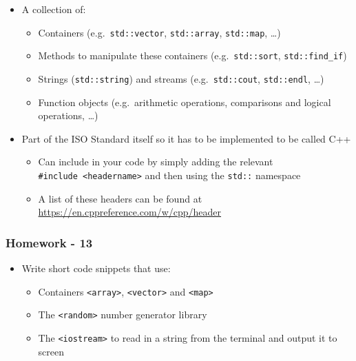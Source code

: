 \begin{itemize}
\tightlist
\item
  A collection of:

  \begin{itemize}
  \tightlist
  \item
    Containers (e.g.~\texttt{std::vector}, \texttt{std::array},
    \texttt{std::map}, \ldots{})
  \item
    Methods to manipulate these containers (e.g.~\texttt{std::sort},
    \texttt{std::find\_if})
  \item
    Strings (\texttt{std::string}) and streams (e.g.~\texttt{std::cout},
    \texttt{std::endl}, \ldots{})
  \item
    Function objects (e.g.~arithmetic operations, comparisons and
    logical operations, \ldots{})
  \end{itemize}
\item
  Part of the ISO Standard itself so it has to be implemented to be
  called C++

  \begin{itemize}
  \tightlist
  \item
    Can include in your code by simply adding the relevant
    \texttt{\#include\ \textless{}headername\textgreater{}} and then
    using the \texttt{std::} namespace
  \item
    A list of these headers can be found at
    \url{https://en.cppreference.com/w/cpp/header}
  \end{itemize}
\end{itemize}

\hypertarget{homework---13}{%
\subsubsection{Homework - 13}\label{homework---13}}

\begin{itemize}
\tightlist
\item
  Write short code snippets that use:

  \begin{itemize}
  \tightlist
  \item
    Containers \texttt{\textless{}array\textgreater{}},
    \texttt{\textless{}vector\textgreater{}} and
    \texttt{\textless{}map\textgreater{}}\\
  \item
    The \texttt{\textless{}random\textgreater{}} number generator
    library
  \item
    The \texttt{\textless{}iostream\textgreater{}} to read in a string
    from the terminal and output it to screen
  \end{itemize}
\end{itemize}

